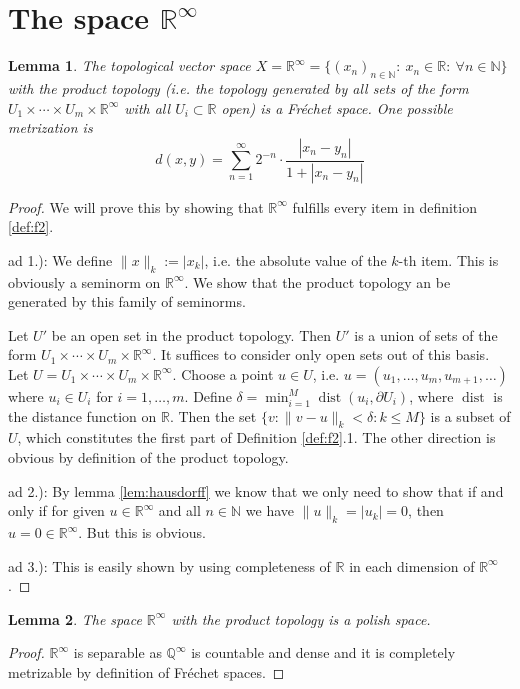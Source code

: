 \documentclass{scrartcl}
\newtheorem{lemma}{Lemma}
\theoremstyle{definition}
\theoremstyle{remark}
\newcommand{\Frechet}{Fr\'echet }
\newcommand{\N}{\mathbb N}
\newcommand{\R}{\mathbb R}
\newcommand{\Q}{\mathbb Q}
\newcommand{\del}{\partial}
\newcommand{\dist}{\operatorname{dist}}
\begin{document}
\section{The space $\R^\infty$}
\begin{lemma}
The topological vector space $X = \R^\infty = \{(x_n)_{n\in\N}: ~x_n\in\R:~\forall n\in\N \}$ with the product topology (i.e. the topology generated by all sets of the form $U_1\times\cdots\times U_m\times \R^\infty$ with all $U_i\subset \R $ open) is a \Frechet space. One possible metrization is
\begin{equation}
d(x, y) = \sum_{n=1}^{\infty}2^{-n}\cdot \frac{|x_n-y_n|}{1 + |x_n-y_n|}
\end{equation}
\end{lemma}
\begin{proof}
We will prove this by showing that $\R^\infty$ fulfills every item in definition \ref{def:f2}.

ad 1.): We define $\|x\|_k := |x_k|$, i.e. the absolute value of the $k$-th item. This is obviously a seminorm on $\R^\infty$. We show that the product topology an be generated by this family of seminorms. 

Let $U'$ be an open set in the product topology. Then $U'$ is a union of sets of the form $U_1\times\cdots\times U_m\times \R^\infty$. It suffices to consider only open sets out of this basis. Let $U = U_1\times\cdots\times U_m\times \R^\infty$. Choose a point $u\in U$, i.e. $u = (u_1, \ldots, u_m, u_{m+1},\ldots)$ where $u_i \in U_i$ for $i=1,\ldots, m$. Define $\delta = \min_{i=1}^M \dist(u_i, \del U_i)$, where $\dist$ is the distance function on $\R$. Then the set $\{v: \|v-u\|_k < \delta: k\leq M\} $ is a subset of $U$, which constitutes the first part of Definition \ref{def:f2}.1. The other direction is obvious by definition of the product topology.

ad 2.): By lemma \ref{lem:hausdorff} we know that we only need to show that if and only if for given $u\in\R^\infty$ and all $n\in \N$ we have $\|u\|_k = |u_k| = 0$, then $u=0\in\R^\infty$. But this is obvious.

ad 3.): This is easily shown by using completeness of $\R$ in each dimension of $\R^\infty$.
\end{proof}

\begin{lemma}
The space $\R^\infty$ with the product topology is a polish space.
\end{lemma}
\begin{proof}
$\R^\infty$ is separable as $\Q^\infty$ is countable and dense and it is completely metrizable by definition of \Frechet spaces.
\end{proof}
\end{document}
